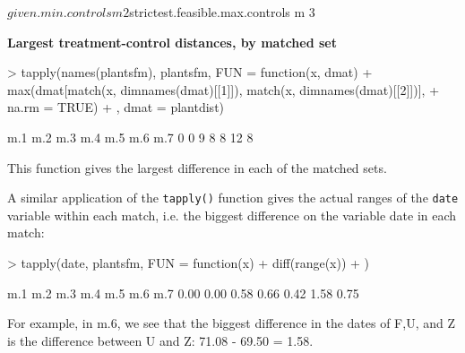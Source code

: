 \documentclass[12pt,twoside]{article}
\begin{document}
{{\begin{Schunk}
\begin{Soutput}
$given.min.controls
m 
2 

$strictest.feasible.max.controls
m 
3 
\end{Soutput}
\end{Schunk}
\bigskip

{\rmfamily \bfseries
Largest treatment{}-control distances, by matched set}

\begin{Schunk}
\begin{Sinput}
> tapply(names(plantsfm), plantsfm, FUN = function(x, dmat) {
+     max(dmat[match(x, dimnames(dmat)[[1]]), match(x, dimnames(dmat)[[2]])], 
+         na.rm = TRUE)
+ }, dmat = plantdist)
\end{Sinput}
\begin{Soutput}
m.1 m.2 m.3 m.4 m.5 m.6 m.7 
  0   0   9   8   8  12   8 
\end{Soutput}
\end{Schunk}

{\rmfamily
This function gives the largest difference in each of the matched sets.}


\bigskip

{\ttfamily
\textrm{A similar application of the }\texttt{tapply()} \textrm{function gives
the actual ranges of the }\texttt{date}\textrm{ variable within each match, i.e.
the biggest difference on the variable }date \textrm{in each match:}}


\bigskip
\begin{Schunk}
\begin{Sinput}
> tapply(date, plantsfm, FUN = function(x) {
+     diff(range(x))
+ })
\end{Sinput}
\begin{Soutput}
 m.1  m.2  m.3  m.4  m.5  m.6  m.7 
0.00 0.00 0.58 0.66 0.42 1.58 0.75 
\end{Soutput}
\end{Schunk}
\bigskip

{\rmfamily
For example, in m.6, we see that the biggest difference in the dates of
F,U, and Z is the difference between U and Z: 71.08 {}- 69.50 = 1.58.


\bigskip

}}}
\end{document}
